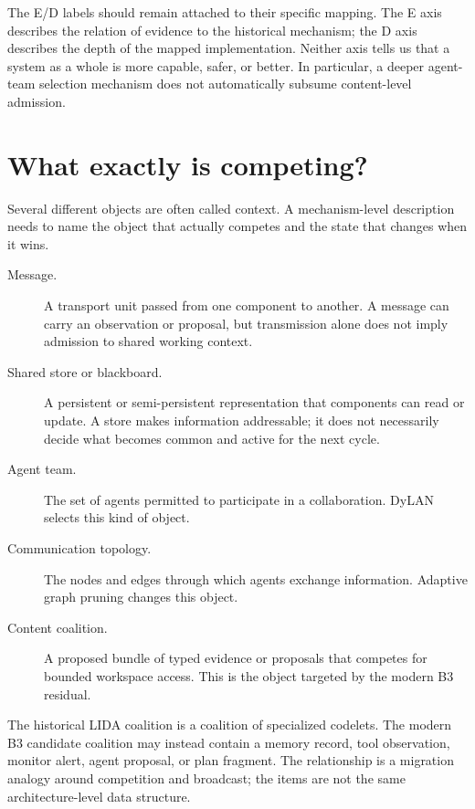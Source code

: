 
The E/D labels should remain attached to their specific mapping. The E axis describes the relation of evidence to the historical mechanism; the D axis describes the depth of the mapped implementation. Neither axis tells us that a system as a whole is more capable, safer, or better. In particular, a deeper agent-team selection mechanism does not automatically subsume content-level admission.

\section{What exactly is competing?}
\label{sec:ch14-semantic-distinction}

Several different objects are often called context. A mechanism-level description needs to name the object that actually competes and the state that changes when it wins.

\begin{description}
  \item[Message.] A transport unit passed from one component to another. A message can carry an observation or proposal, but transmission alone does not imply admission to shared working context.
  \item[Shared store or blackboard.] A persistent or semi-persistent representation that components can read or update. A store makes information addressable; it does not necessarily decide what becomes common and active for the next cycle.
  \item[Agent team.] The set of agents permitted to participate in a collaboration. DyLAN selects this kind of object.
  \item[Communication topology.] The nodes and edges through which agents exchange information. Adaptive graph pruning changes this object.
  \item[Content coalition.] A proposed bundle of typed evidence or proposals that competes for bounded workspace access. This is the object targeted by the modern B3 residual.
\end{description}

The historical LIDA coalition is a coalition of specialized codelets. The modern B3 candidate coalition may instead contain a memory record, tool observation, monitor alert, agent proposal, or plan fragment. The relationship is a migration analogy around competition and broadcast; the items are not the same architecture-level data structure.

